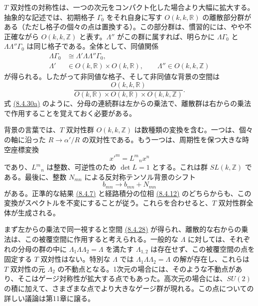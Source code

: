 $T$ 双対性の対称性は、一つの次元をコンパクト化した場合より大幅に拡大する。抽象的な記述では、初期格子 $\Gamma_0$ をそれ自身に写す $O(k,k,\mathbb R)$ の離散部分群がある（ただし格子の個々の点は置換する）。この部分群は、慣習的には、やや不正確ながら $O(k,k,\mathbb Z)$ と表す。$\Lambda''$ がこの群に属すれば、明らかに $\Lambda\Gamma_0$ と $\Lambda\Lambda''\Gamma_0$ は同じ格子である。全体として、同値関係
\begin{align}
\Lambda\Gamma_0&\cong\Lambda'\Lambda\Lambda''\Gamma_0,
\tag{8.4.30a}\label{eq:8.4.30a}\\
\Lambda'&\in O(k,\mathbb R)\times O(k,\mathbb R),\qquad
\Lambda''\in O(k,k,\mathbb Z)
\tag{8.4.30b}\label{eq:8.4.30b}
\end{align}
が得られる。したがって非同値な格子、そして非同値な背景の空間は
\begin{equation}
\frac{O(k,k,\mathbb R)}{O(k,\mathbb R)\times O(k,\mathbb R)\times O(k,k,\mathbb Z)}.
\tag{8.4.31}\label{eq:8.4.31}
\end{equation}
式 \hyperref[eq:8.4.30a]{(8.4.30a)} のように、分母の連続群は左からの乗法で、離散群は右からの乗法で作用することを覚えておく必要がある。

背景の言葉では、$T$ 双対性群 $O(k,k,\mathbb Z)$ は数種類の変換を含む。一つは、個々の軸に沿った $R\to\alpha'/R$ の双対性である。もう一つは、周期性を保つ大きな時空座標変換
\begin{equation}
x'^m=L^m{}_nx^n
\tag{8.4.32}\label{eq:8.4.32}
\end{equation}
であり、$L^m{}_n$ は整数、可逆性のため $\det L=1$ とする。これは群 $SL(k,\mathbb Z)$ である。最後に、整数 $N_{mn}$ による反対称テンソル背景のシフト
\begin{equation}
b_{mn}\to b_{mn}+N_{mn}
\tag{8.4.33}\label{eq:8.4.33}
\end{equation}
がある。正準的な結果 \hyperref[eq:8.4.7]{(8.4.7)} と経路積分の位相 \hyperref[eq:8.4.12]{(8.4.12)} のどちらからも、この変換がスペクトルを不変にすることが従う。これらを合わせると、$T$ 双対性群全体が生成される。

まず左からの乗法で同一視すると空間 \hyperref[eq:8.4.28]{(8.4.28)} が得られ、離散的な右からの乗法は、この被覆空間に作用すると考えられる。一般的な $\Lambda$ に対しては、それぞれの分母の群の中に $\Lambda_1\Lambda\Lambda_2=\Lambda$ を満たす $\Lambda_{1,2}$ は存在せず、この被覆空間の点を固定する $T$ 双対性はない。特別な $\Lambda$ では $\Lambda_1\Lambda\Lambda_2=\Lambda$ の解が存在し、これらは $T$ 双対性の元 $\Lambda_2$ の不動点となる。1次元の場合には、そのような不動点があり、そこはゲージ対称性が拡大する点でもあった。高次元の場合には、$SU(2)$ の積に加えて、さまざまな点でより大きなゲージ群が現れる。この点についての詳しい議論は第11章に譲る。

